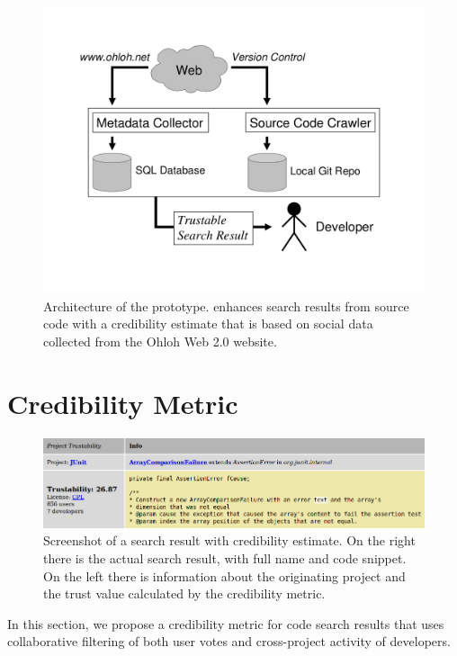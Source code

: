 \begin{figure}
  \centering
    \includegraphics[width=0.8\linewidth]{fig/bender-architecture-diagram}
    \caption{
    {\small
    Architecture of the \Jbd prototype. \Jbd enhances search results from source code with a credibility estimate that is based on social data collected from the Ohloh Web 2.0 website.
    }
    }
    \label{fig:archi}
\end{figure}
\section{Credibility Metric}
\label{sec:metric}

\begin{figure}
  \centering
  	 \includegraphics[width=\linewidth]{fig/bender-screenshot}
    \caption{
    {\small
    Screenshot of a \Jbd search result with credibility estimate. On the right there is the actual search result, with full name and code snippet. On the left there is information about the originating project and the trust value calculated by the credibility metric.
    }
    }
    \label{fig:screenshot}
\end{figure}

In this section, we propose a credibility metric for code search results that uses collaborative filtering of both user votes and cross-project activity of developers.

